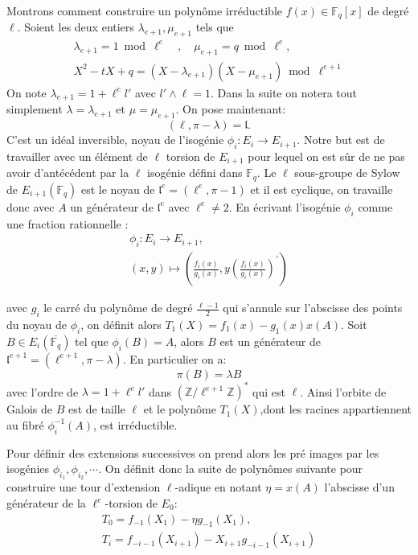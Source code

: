 \documentclass[10pt,a4paper]{book}
\theoremstyle{plain}
\theoremstyle{definition}
\theoremstyle{definition}
\theoremstyle{definition}
\theoremstyle{definition}
\theoremstyle{remark}
\theoremstyle{remark}
\begin{document}
Montrons comment construire un polynôme irréductible $f(x) \in \mathbb{F}_q[x]$ de degré $\ell$. Soient  les deux entiers $\lambda_{e+1}, \mu_{e+1}$ tels que 
\begin{align*}
\lambda_{e+1}=1 \bmod \ell^{e} \quad , \quad \mu_{e+1}=q \bmod \ell^e, \\
X^2-tX+q = (X-\lambda_{e+1})(X-\mu_{e+1}) \bmod \ell^{e+1} 
\end{align*}
On note $\lambda_{e+1}=1+\ell^el'$ avec $l' \wedge \ell = 1$. Dans la suite on notera tout simplement $\lambda=\lambda_{e+1}$ et $\mu = \mu_{e+1}$. On pose maintenant:
\begin{equation*}
(\ell,\pi-\lambda)=\mathfrak{l}.
\end{equation*}
C'est un idéal inversible, noyau de l'isogénie $\phi_{i}:E_i \to E_{i+1}$. Notre but est de travailler avec un élément de $\ell$ torsion de $E_{i+1}$ pour lequel on est sûr de ne pas avoir d'antécédent par la $\ell$ isogénie défini dans $\mathbb{F}_q$. Le $\ell$ sous-groupe de Sylow de $E_{i+1}(\mathbb{F}_q)$ est le noyau de $\mathfrak{l}^e=(\ell^e,\pi - 1)$ et il est cyclique, on travaille donc avec $A$ un générateur de $\mathfrak{l}^e$ avec $\ell^e \neq 2$. En écrivant l'isogénie $\phi_i$ comme une fraction rationnelle : 
\begin{align*}
\phi_{i}:E_i \to E_{i+1}, \\
(x,y) \mapsto \left( \frac{f_{i}(x)}{g_{i}(x)} ,y \left( \frac{f_{i}(x)}{g_{i}(x)} \right) ^{'} \right)
\end{align*}

avec $g_i$ le carré du polynôme de degré $\frac{\ell-1}{2}$  qui s'annule sur l'abscisse des points du noyau de $\phi_{i}$, on  définit alors $ T_{1}(X)=f_{1}(x)-g_{1}(x)x(A)$. Soit $B \in E_i(\overline{\mathbb{F}_q})$ tel que $\phi_i(B)=A$, alors  $B$ est un générateur de $\mathfrak{l}^{e+1}=(\ell^{e+1},\pi-\lambda)$. En particulier on a:
\begin{equation*}
\pi(B)=\lambda B
\end{equation*}
avec l'ordre de $\lambda=1+\ell^el'$ dans $(\mathbb{Z}/\ell^{e+1}\mathbb{Z})^*$ qui est $\ell$. Ainsi l'orbite de Galois de $B$ est de taille $\ell$ et le polynôme $T_{1}(X)$,dont les racines appartiennent au fibré $\phi_i^{-1}(A)$, est irréductible. 

Pour définir des extensions successives on prend alors les pré images par les isogénies $\phi_{i_1},\phi_{i_2}, \cdots$. On définit donc la suite de polynômes suivante pour construire une tour d'extension $\ell$-adique en notant $\eta =x(A)$ l'abscisse d'un générateur de la $\ell^e$-torsion de $E_0$:
\begin{align*}
T_0=f_{-1}(X_1)-\eta g_{-1}(X_1), \\
T_i=f_{-i-1}(X_{i+1})-X_{i+1}g_{-i-1}(X_{i+1})
\end{align*}
\end{document}
